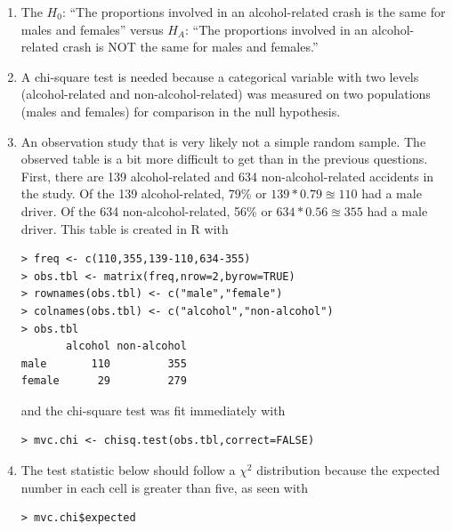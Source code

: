 \documentclass[10pt,openany]{book}\usepackage[]{graphicx}\usepackage[]{color}
\makeatletter
\newenvironment{kframe}{%
 \def\at@end@of@kframe{}%
 \ifinner\ifhmode%
  \def\at@end@of@kframe{\end{minipage}}%
  \begin{minipage}{\columnwidth}%
 \fi\fi%
 \def\FrameCommand##1{\hskip\@totalleftmargin \hskip-\fboxsep
 \colorbox{shadecolor}{##1}\hskip-\fboxsep
     \hskip-\linewidth \hskip-\@totalleftmargin \hskip\columnwidth}%
 \MakeFramed {\advance\hsize-\width
   \@totalleftmargin\z@ \linewidth\hsize
   \@setminipage}}%
 {\par\unskip\endMakeFramed%
 \at@end@of@kframe}
\newenvironment{knitrout}{}{} %
\makeatother
\begin{document}
\begin{itemize}
\begin{enumerate}
      \item The $H_{0}$: ``The proportions involved in an alcohol-related crash is the same for males and females'' versus $H_{A}$: ``The proportions involved in an alcohol-related crash is NOT the same for males and females.''
      \item A chi-square test is needed because a categorical variable with two levels (alcohol-related and non-alcohol-related) was measured on two populations (males and females) for comparison in the null hypothesis.
      \item An observation study that is very likely not a simple random sample.  The observed table is a bit more difficult to get than in the previous questions.  First, there are 139 alcohol-related and 634 non-alcohol-related accidents in the study.  Of the 139 alcohol-related, 79\% or $139*0.79\approxeq110$ had a male driver.  Of the 634 non-alcohol-related, 56\% or $634*0.56\approxeq355$ had a male driver.  This table is created in R with
\begin{knitrout}
\color{fgcolor}\begin{kframe}
\begin{verbatim}
> freq <- c(110,355,139-110,634-355)
> obs.tbl <- matrix(freq,nrow=2,byrow=TRUE)
> rownames(obs.tbl) <- c("male","female")
> colnames(obs.tbl) <- c("alcohol","non-alcohol")
> obs.tbl
       alcohol non-alcohol
male       110         355
female      29         279
\end{verbatim}
\end{kframe}
\end{knitrout}
and the chi-square test was fit immediately with
\begin{knitrout}
\color{fgcolor}\begin{kframe}
\begin{verbatim}
> mvc.chi <- chisq.test(obs.tbl,correct=FALSE)
\end{verbatim}
\end{kframe}
\end{knitrout}
      \item The test statistic below should follow a $\chi^{2}$ distribution because the expected number in each cell is greater than five, as seen with
\begin{knitrout}
\color{fgcolor}\begin{kframe}
\begin{verbatim}
> mvc.chi$expected

\end{verbatim}
\end{kframe}
\end{knitrout}
\end{enumerate}
\end{itemize}
\end{document}
